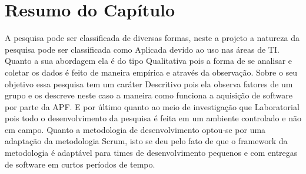 \section{Resumo do Capítulo}
A pesquisa pode ser classificada de diversas formas, neste a projeto a natureza da pesquisa pode ser classificada como Aplicada devido ao uso nas áreas de TI. Quanto a sua abordagem ela é do tipo Qualitativa pois a forma de se analisar e coletar os dados é feito de maneira empírica e através da observação. Sobre o seu objetivo essa pesquisa tem um caráter Descritivo pois ela observa fatores de um grupo e os descreve neste caso a maneira como funciona a aquisição de software por parte da APF. E por último quanto ao meio de investigação que Laboratorial pois todo o desenvolvimento da pesquisa é feita em um ambiente controlado e não em campo.
Quanto a metodologia de desenvolvimento optou-se por uma adaptação da metodologia Scrum, isto se deu pelo fato de que o framework da metodologia é adaptável para times de desenvolvimento pequenos e com entregas de software em curtos períodos de tempo.
